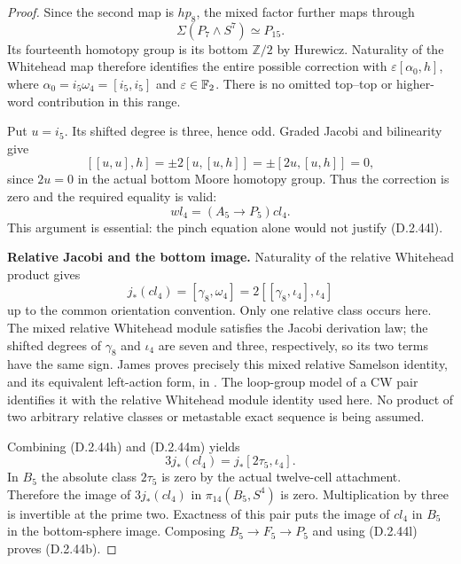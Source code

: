 \begin{proof}
Since the second map is $h p_8$, the mixed factor further
maps through
\[
       \Sigma(P_7\wedge S^7)\simeq P_{15}.
 \tag{D.2.44j}
\]
Its fourteenth homotopy group is its bottom $\mathbb Z/2$
by Hurewicz.  Naturality of the Whitehead map therefore
identifies the entire possible correction with
$\varepsilon[\alpha_0,h]$, where
$\alpha_0=i_5\omega_4=[i_5,i_5]$ and
$\varepsilon\in\mathbb F_2$.  There is no omitted top--top
or higher-word contribution in this range.

Put $u=i_5$.  Its shifted degree is three, hence odd.
Graded Jacobi and bilinearity give
\[
 [[u,u],h]=\pm2[u,[u,h]]
          =\pm[2u,[u,h]]=0,
 \tag{D.2.44k}
\]
since $2u=0$ in the actual bottom Moore homotopy group.
Thus the correction is zero and the required equality is
valid:
\[
                 wl_4=(A_5\longrightarrow P_5)cl_4.
 \tag{D.2.44l}
\]
This argument is essential: the pinch equation alone would
not justify (D.2.44l).

\medskip\noindent
\textbf{Relative Jacobi and the bottom image.}
Naturality of the relative Whitehead product gives
\[
 j_*(cl_4)=[\gamma_8,\omega_4]
          =2[[\gamma_8,\iota_4],\iota_4]
 \tag{D.2.44m}
\]
up to the common orientation convention.  Only one relative
class occurs here.  The mixed relative Whitehead module
satisfies the Jacobi derivation law; the shifted degrees of
$\gamma_8$ and $\iota_4$ are seven and three, respectively,
so its two terms have the same sign.  James proves precisely
this mixed relative Samelson identity, and its equivalent
left-action form, in
\cite[\S4, equations (4.1)--(4.2), p.~337]{FGHJames1971}.
The loop-group model of a CW pair identifies it with the
relative Whitehead module identity used here.  No product
of two arbitrary relative classes or metastable exact
sequence is being assumed.

Combining (D.2.44h) and (D.2.44m) yields
\[
           3j_*(cl_4)=j_*[2\tau_5,\iota_4].
 \tag{D.2.44n}
\]
In $B_5$ the absolute class $2\tau_5$ is zero by the
actual twelve-cell attachment.  Therefore the image of
$3j_*(cl_4)$ in $\pi_{14}(B_5,S^4)$ is zero.  Multiplication
by three is invertible at the prime two.  Exactness of this
pair puts the image of $cl_4$ in $B_5$ in the bottom-sphere
image.  Composing $B_5\to F_5\to P_5$ and using
(D.2.44l) proves (D.2.44b).


\end{proof}
